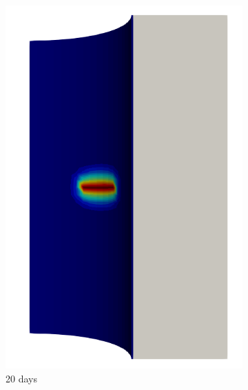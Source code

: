 \begin{figure}[!htb]
  \centering
  \begin{subfigure}[b]{0.2\textwidth}
    \centering
    \includegraphics[width=\textwidth]{Chapter5/figures/spallation/seed_d_1}
    \caption{20 days}
  \end{subfigure}
  \begin{subfigure}[b]{0.2\textwidth}
    \centering

\end{subfigure}
\end{figure}
